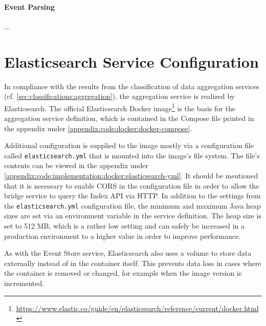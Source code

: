 \paragraph{Event Parsing}
...

%

\section{Elasticsearch Service Configuration}
\label{sec:implementation:aggregation}

In compliance with the results from the classification of data aggregation services (cf. \cref{sec:classifications:aggregation}), the aggregation service is realized by Elasticsearch.
The official Elasticsearch Docker image\footnote{\url{https://www.elastic.co/guide/en/elasticsearch/reference/current/docker.html}} is the basis for the aggregation service definition, which is contained in the Compose file printed in the appendix under \cref{appendix:code:docker:docker-compose}.

Additional configuration is supplied to the image mostly via a configuration file called \texttt{elasticsearch.yml} that is mounted into the image's file system.
The file's contents can be viewed in the appendix under \cref{appendix:code:implementation:docker:elasticsearch-yml}.
It should be mentioned that it is necessary to enable \ac{CORS} in the configuration file in order to allow the bridge service to query the Index \ac{API} via \ac{HTTP}.
In addition to the settings from the \texttt{elasticsearch.yml} configuration file, the minimum and maximum Java heap sizes are set via an environment variable in the service definition.
The heap size is set to 512 MB, which is a rather low setting and can safely be increased in a production environment to a higher value in order to improve performance.

As with the Event Store service, Elasticsearch also uses a volume to store data externally instead of in the container itself.
This prevents data loss in cases where the container is removed or changed, for example when the image version is incremented.

